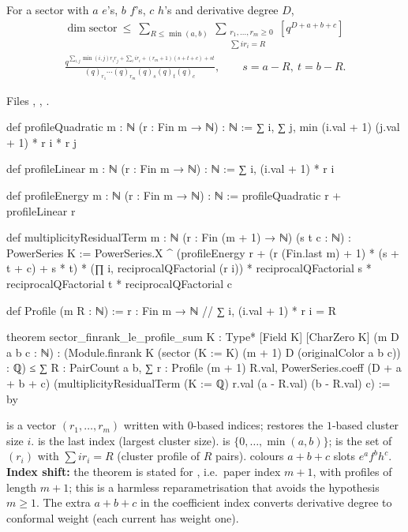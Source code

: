 \begin{theorem}\label{l20:thm:sectorbound}
For a sector with $a$ $e$'s, $b$ $f$'s, $c$ $h$'s and derivative degree $D$,
\begin{multline*}
\dim\mathrm{sector}\ \le\ \sum_{R\le\min(a,b)}\ \sum_{\substack{r_1,\dots,r_m\ge0\\ \sum ir_i=R}}
[q^{D+a+b+c}]\\ \frac{q^{\sum_{i,j}\min(i,j)r_ir_j+\sum_iir_i+(r_m+1)(s+t+c)+st}}{(q)_{r_1}\cdots(q)_{r_m}(q)_s(q)_t(q)_c},
\qquad s=a-R,\ t=b-R.
\end{multline*}
\end{theorem}
\noindent Files ,
,
.
\begin{leancode}
def profileQuadratic {m : ℕ} (r : Fin m → ℕ) : ℕ :=
  ∑ i, ∑ j, min (i.val + 1) (j.val + 1) * r i * r j

def profileLinear {m : ℕ} (r : Fin m → ℕ) : ℕ :=
  ∑ i, (i.val + 1) * r i

def profileEnergy {m : ℕ} (r : Fin m → ℕ) : ℕ := profileQuadratic r + profileLinear r

def multiplicityResidualTerm {m : ℕ} (r : Fin (m + 1) → ℕ) (s t c : ℕ) : PowerSeries K :=
  PowerSeries.X ^ (profileEnergy r + (r (Fin.last m) + 1) * (s + t + c) + s * t) *
    (∏ i, reciprocalQFactorial (r i)) * reciprocalQFactorial s *
      reciprocalQFactorial t * reciprocalQFactorial c

def Profile (m R : ℕ) := {r : Fin m → ℕ // ∑ i, (i.val + 1) * r i = R}

theorem sector_finrank_le_profile_sum {K : Type*} [Field K] [CharZero K]
    (m D a b c : ℕ) :
    (Module.finrank K (sector (K := K) (m + 1) D (originalColor a b c)) : ℚ) ≤
      ∑ R : PairCount a b, ∑ r : Profile (m + 1) R.val,
        PowerSeries.coeff (D + a + b + c)
          (multiplicityResidualTerm (K := ℚ) r.val (a - R.val) (b - R.val) c) := by
\end{leancode}

\begin{dictionary}
 is a vector $(r_1,\dots,r_m)$ written with $0$-based indices;  restores the
$1$-based cluster size $i$.  is the last index (largest cluster size).  is
$\{0,\dots,\min(a,b)\}$;  is the set of $(r_i)$ with $\sum ir_i=R$ (cluster profile of $R$ pairs).
 colours $a+b+c$ slots $e^af^bh^c$. \textbf{Index shift:} the theorem is stated for
, i.e.\ paper index $m+1$, with profiles of length $m+1$; this is a harmless
reparametrisation that avoids the hypothesis $m\ge1$. The extra $a+b+c$ in the coefficient index converts derivative
degree to conformal weight (each current has weight one).
\end{dictionary}

